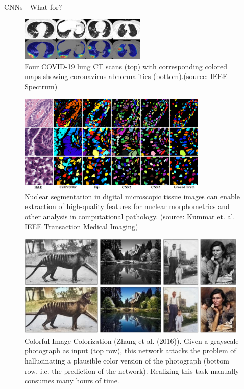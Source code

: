 \begin{vbframe}{CNNs - What for?}
   \begin{figure}
    \centering
    \includegraphics[width=6cm]{plots/hitmap.jpeg}
    \caption{Four COVID-19 lung CT scans (top) with corresponding colored maps showing coronavirus abnormalities (bottom).(source: IEEE Spectrum)}
  \end{figure}
\framebreak
  \begin{figure}
    \centering
    \includegraphics[width=9cm]{plots/instanceseg.png}
    \caption{Nuclear segmentation in digital microscopic tissue images can enable extraction of high-quality features for nuclear morphometrics and other analysis in computational pathology. (source: Kummar et. al. IEEE Transaction Medical Imaging) }
  \end{figure}
\framebreak
  \begin{figure}
    \centering
    \includegraphics[width=11cm]{plots/01_introduction/colorization.png}
    \caption{Colorful Image Colorization (Zhang et al. (2016)). Given a grayscale photograph as input (top row), this network attacks the problem of hallucinating a plausible color version of the photograph (bottom row, i.e. the prediction of the network). Realizing this task manually consumes many hours of time.}
  \end{figure}
\framebreak
  \begin{figure}

\end{figure}
\end{vbframe}
